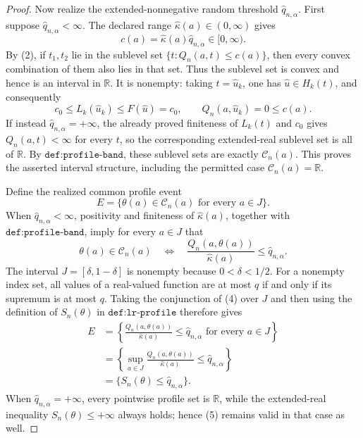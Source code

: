 \documentclass{article}
\begin{document}
\begin{proof}
Now realize the extended-nonnegative random threshold \(\widehat q_{n,\alpha}\).  First suppose \(\widehat q_{n,\alpha}<\infty\).  The declared range \(\widehat\kappa(a)\in(0,\infty)\) gives
\[
 c(a)=\widehat\kappa(a)\widehat q_{n,\alpha}\in[0,\infty).
\]
By (2), if \(t_1,t_2\) lie in the sublevel set \(\{t:Q_n(a,t)\le c(a)\}\), then every convex combination of them also lies in that set.  Thus the sublevel set is convex and hence is an interval in \(\mathbb R\).  It is nonempty: taking \(t=\widehat u_k\), one has \(\widehat u\in H_k(t)\), and consequently
\[
 c_0\le L_k(\widehat u_k)\le F(\widehat u)=c_0,
 \qquad
 Q_n(a,\widehat u_k)=0\le c(a).                              \tag{3}
\]
If instead \(\widehat q_{n,\alpha}=+\infty\), the already proved finiteness of \(L_k(t)\) and \(c_0\) gives \(Q_n(a,t)<\infty\) for every \(t\), so the corresponding extended-real sublevel set is all of \(\mathbb R\).  By \(\texttt{def:profile-band}\), these sublevel sets are exactly \(\mathcal C_n(a)\).  This proves the asserted interval structure, including the permitted case \(\mathcal C_n(a)=\mathbb R\).

Define the realized common profile event
\[
 E=\{\theta(a)\in\mathcal C_n(a)\text{ for every }a\in J\}.
\]
When \(\widehat q_{n,\alpha}<\infty\), positivity and finiteness of \(\widehat\kappa(a)\), together with \(\texttt{def:profile-band}\), imply for every \(a\in J\) that
\[
 \theta(a)\in\mathcal C_n(a)
 \quad\Longleftrightarrow\quad
 \frac{Q_n(a,\theta(a))}{\widehat\kappa(a)}
 \le \widehat q_{n,\alpha}.                                 \tag{4}
\]
The interval \(J=[\delta,1-\delta]\) is nonempty because \(0<\delta<1/2\).  For a nonempty index set, all values of a real-valued function are at most \(q\) if and only if its supremum is at most \(q\).  Taking the conjunction of (4) over \(J\) and then using the definition of \(S_n(\theta)\) in \(\texttt{def:lr-profile}\) therefore gives
\[
 \begin{aligned}
 E
 &=\left\{\frac{Q_n(a,\theta(a))}{\widehat\kappa(a)}
       \le\widehat q_{n,\alpha}\text{ for every }a\in J\right\}\\
 &=\left\{\sup_{a\in J}
       \frac{Q_n(a,\theta(a))}{\widehat\kappa(a)}
       \le\widehat q_{n,\alpha}\right\}\\
 &=\{S_n(\theta)\le\widehat q_{n,\alpha}\}.                 \tag{5}
 \end{aligned}
\]
When \(\widehat q_{n,\alpha}=+\infty\), every pointwise profile set is \(\mathbb R\), while the extended-real inequality \(S_n(\theta)\le+\infty\) always holds; hence (5) remains valid in that case as well.


\end{proof}
\end{document}
